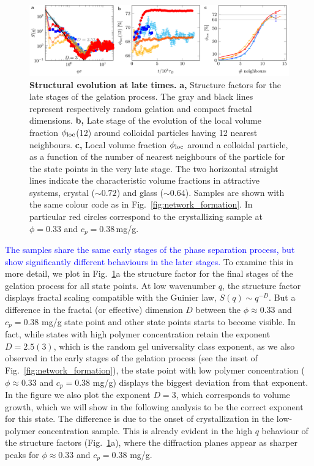 \documentclass[preprint,amsmath,amssymb,superscriptaddress]{revtex4-1}
\begin{document}
\begin{figure}
 \includegraphics[width=16cm]{late_structure.pdf}
 \caption{{\bf Structural evolution at late times.} 
{\bf a,} Structure factors for the late stages of the gelation process. The gray and black lines represent respectively random gelation and compact fractal dimensions.
{\bf b,} Late stage of the evolution of the local volume fraction $\phi_{\rm loc}$(12) around colloidal particles having 12 nearest neighbours.
{\bf c,} Local volume fraction $\phi_{\rm loc}$ around a colloidal particle, as a function of the number of nearest neighbours of the particle for the state points in the very late stage. 
The two horizontal straight lines indicate the characteristic volume fractions in attractive systems, crystal ($\sim 0.72$) and glass ($\sim 0.64$).
Samples are shown with the same colour code as in Fig.~\ref{fig:network_formation}. In particular red circles correspond to the crystallizing sample at $\phi=0.33$ and $c_p=0.38\,$mg/g.
 }
 \label{fig:late_structure}
\end{figure}

\textcolor{blue}{The samples share the same early stages of the phase separation process, but show significantly different behaviours in the later stages.}
To examine this in more detail, we plot in Fig.~\ref{fig:late_structure}a the structure factor for the final stages of the gelation process for all state points.
At low wavenumber $q$, the structure factor displays fractal scaling compatible with the Guinier law, $S(q)\sim q^{-D}$.
But a difference in the fractal (or effective) dimension $D$ between the $\phi\approx 0.33$ and $c_p=0.38$ mg/g state point and other state points starts to become visible. In fact, while states
with high polymer concentration retain the exponent $D=2.5(3)$, 
which is the random gel universality class exponent, as we also observed in the early stages of the gelation process (see the inset of Fig.~\ref{fig:network_formation}),
the state point with low polymer concentration ($\phi\approx 0.33$ and $c_p=0.38$ mg/g) displays the biggest deviation from that exponent. In the figure we also
plot the exponent $D=3$, which corresponds to volume growth, which we will show in the following analysis to be the correct exponent for this state. 
The difference is due to the onset of crystallization in the low-polymer concentration sample. This is already evident in the high $q$ behaviour of 
the structure factors (Fig.~\ref{fig:late_structure}a), where the diffraction planes appear as sharper peaks for $\phi\approx 0.33$ and $c_p=0.38$ mg/g.
\end{document}
